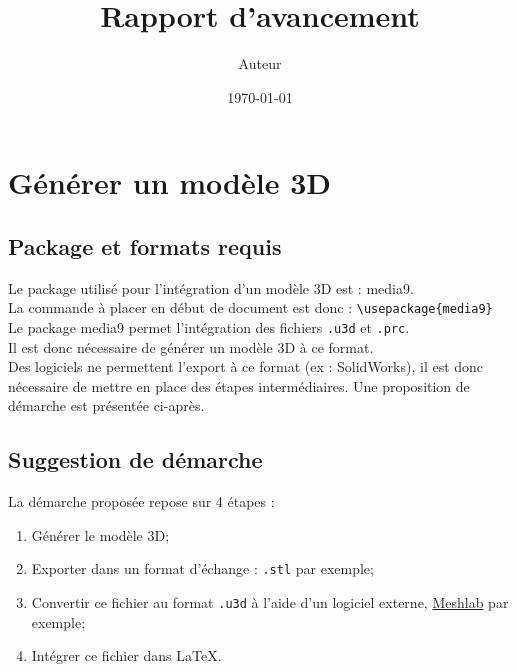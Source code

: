\documentclass[a4paper,12pt]{report}
\author{Auteur}
\title{Rapport d'avancement}
\date{\today}
\begin{document}
\graphicspath{{Figures/}}




\renewcommand\contentsname{Sommaire}
\setcounter{chapter}{1}
\tableofcontents



\newpage

\section{Générer un modèle 3D}
\subsection{Package et formats requis}
Le package utilisé pour l'intégration d'un modèle 3D est : media9. \\
La commande à placer en début de document est donc : \verb|\usepackage{media9}| \\

Le package media9 permet l'intégration des fichiers \verb|.u3d| et \verb|.prc|. \\
Il est donc nécessaire de générer un modèle 3D à ce format. \\

Des logiciels ne permettent l'export à ce format (ex : SolidWorks), il est donc nécessaire de mettre en place des étapes intermédiaires. Une proposition de démarche est présentée ci-après.

\subsection{Suggestion de démarche}

La démarche proposée repose sur 4 étapes :
\begin{enumerate}
\item Générer le modèle 3D;
\item Exporter dans un format d'échange : \verb|.stl| par exemple;
\item Convertir ce fichier au format \verb|.u3d| à l'aide d'un logiciel externe, \href{http://www.meshlab.net/}{Meshlab} par exemple;
\item Intégrer ce fichier dans \LaTeX.
\end{enumerate}
\end{document}
